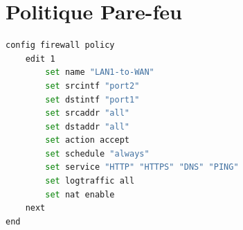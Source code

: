 \section{Politique Pare-feu}

\begin{lstlisting}[language=bash, caption={LAN1 vers WAN avec SNAT}]
config firewall policy
    edit 1
        set name "LAN1-to-WAN"
        set srcintf "port2"
        set dstintf "port1"
        set srcaddr "all"
        set dstaddr "all"
        set action accept
        set schedule "always"
        set service "HTTP" "HTTPS" "DNS" "PING"
        set logtraffic all
        set nat enable
    next
end
\end{lstlisting}
